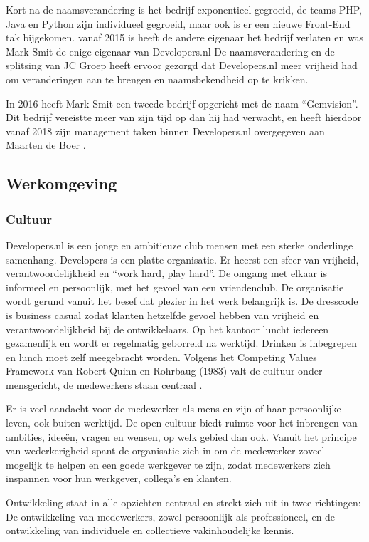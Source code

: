 Kort na de naamsverandering is het bedrijf exponentieel gegroeid, de teams PHP, Java en Python zijn individueel gegroeid, maar ook is er een nieuwe Front-End tak bijgekomen.  vanaf 2015 is heeft de andere eigenaar het bedrijf verlaten en was Mark Smit de enige eigenaar van Developers.nl De naamsverandering en de splitsing van JC Groep heeft ervoor gezorgd dat Developers.nl meer vrijheid had om veranderingen aan te brengen en naamsbekendheid op te krikken. 

In 2016 heeft Mark Smit een tweede bedrijf opgericht met de naam \enquote{Gemvision}. Dit bedrijf vereistte meer van zijn tijd op dan hij had verwacht, en heeft hierdoor vanaf 2018 zijn management taken binnen Developers.nl overgegeven aan Maarten de Boer \parencite{Stageplan}.

\subsection{Werkomgeving}
\subsubsection{Cultuur}
Developers.nl is een jonge en ambitieuze club mensen met een sterke onderlinge samenhang. Developers is een platte organisatie. Er heerst een sfeer van vrijheid, verantwoordelijkheid en \enquote{work hard, play hard}. De omgang met elkaar is informeel en persoonlijk, met het gevoel van een vriendenclub. De organisatie wordt gerund vanuit het besef dat plezier in het werk belangrijk is. De dresscode is business casual zodat klanten hetzelfde gevoel hebben van vrijheid en verantwoordelijkheid bij de ontwikkelaars. Op het kantoor luncht iedereen gezamenlijk en wordt er regelmatig geborreld na werktijd. Drinken is inbegrepen en lunch moet zelf meegebracht worden. Volgens het Competing Values Framework van Robert Quinn en Rohrbaug (1983) valt de cultuur onder mensgericht, de medewerkers staan centraal \parencite{Bedrijfscultuur}.

Er is veel aandacht voor de medewerker als mens en zijn of haar persoonlijke leven, ook buiten werktijd. De open cultuur biedt ruimte voor het inbrengen van ambities, ideeën, vragen en wensen, op welk gebied dan ook. Vanuit het principe van wederkerigheid spant de organisatie zich in om de medewerker zoveel mogelijk te helpen en een goede werkgever te zijn, zodat medewerkers zich inspannen voor hun werkgever, collega’s en klanten.

Ontwikkeling staat in alle opzichten centraal en strekt zich uit in twee richtingen: De ontwikkeling van medewerkers, zowel persoonlijk als professioneel, en de ontwikkeling van individuele en collectieve vakinhoudelijke kennis.

